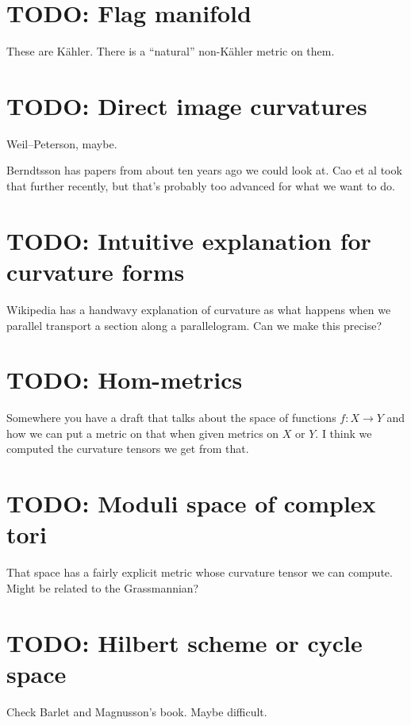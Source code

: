 \documentclass[11pt]{article}
\begin{document}
\section{TODO: Flag manifold}
\label{sec:orga0ef6a0}

These are K\"ahler. There is a ``natural'' non-K\"ahler metric on them.




\section{TODO: Direct image curvatures}
\label{sec:org5619e67}

Weil--Peterson, maybe.

Berndtsson has papers from about ten years ago we could look at. Cao et al took that further recently, but that's probably too advanced for what we want to do.


\section{TODO: Intuitive explanation for curvature forms}
\label{sec:org2b43ecb}

Wikipedia has a handwavy explanation of curvature as what happens when we parallel transport a section along a parallelogram. Can we make this precise?



\section{TODO: Hom-metrics}

Somewhere you have a draft that talks about the space of functions $f : X \to Y$ and how we can put a metric on that when given metrics on $X$ or $Y$. I think we computed the curvature tensors we get from that.


\section{TODO: Moduli space of complex tori}

That space has a fairly explicit metric whose curvature tensor we can compute. Might be related to the Grassmannian?


\section{TODO: Hilbert scheme or cycle space}

Check Barlet and Magnusson's book. Maybe difficult.
\end{document}
